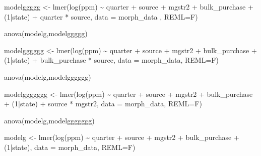 \documentclass[
  11pt,
]{article}
\newenvironment{Shaded}{\begin{snugshade}}{\end{snugshade}}
\newcommand{\AttributeTok}[1]{\textcolor[rgb]{0.77,0.63,0.00}{#1}}
\newcommand{\DecValTok}[1]{\textcolor[rgb]{0.00,0.00,0.81}{#1}}
\newcommand{\FunctionTok}[1]{\textcolor[rgb]{0.00,0.00,0.00}{#1}}
\newcommand{\NormalTok}[1]{#1}
\newcommand{\OtherTok}[1]{\textcolor[rgb]{0.56,0.35,0.01}{#1}}
\newcommand{\SpecialCharTok}[1]{\textcolor[rgb]{0.00,0.00,0.00}{#1}}
\begin{document}
\begin{Shaded}
\begin{Highlighting}[]
\NormalTok{modelggggg }\OtherTok{\textless{}{-}} \FunctionTok{lmer}\NormalTok{(}\FunctionTok{log}\NormalTok{(ppm) }\SpecialCharTok{\textasciitilde{}}\NormalTok{  quarter }\SpecialCharTok{+}\NormalTok{ source }\SpecialCharTok{+}\NormalTok{ mgstr2 }\SpecialCharTok{+}\NormalTok{ bulk\_purchase }\SpecialCharTok{+}\NormalTok{ (}\DecValTok{1}\SpecialCharTok{|}\NormalTok{state) }\SpecialCharTok{+}
\NormalTok{                 quarter }\SpecialCharTok{*}\NormalTok{ source, }\AttributeTok{data =}\NormalTok{ morph\_data , }\AttributeTok{REML=}\NormalTok{F)}

\FunctionTok{anova}\NormalTok{(modelg,modelggggg)}

\NormalTok{modelgggggg }\OtherTok{\textless{}{-}} \FunctionTok{lmer}\NormalTok{(}\FunctionTok{log}\NormalTok{(ppm) }\SpecialCharTok{\textasciitilde{}}\NormalTok{  quarter }\SpecialCharTok{+}\NormalTok{ source }\SpecialCharTok{+}\NormalTok{ mgstr2 }\SpecialCharTok{+}\NormalTok{ bulk\_purchase }\SpecialCharTok{+}\NormalTok{ (}\DecValTok{1}\SpecialCharTok{|}\NormalTok{state) }\SpecialCharTok{+}
\NormalTok{                 bulk\_purchase }\SpecialCharTok{*}\NormalTok{ source, }\AttributeTok{data =}\NormalTok{ morph\_data, }\AttributeTok{REML=}\NormalTok{F)}

\FunctionTok{anova}\NormalTok{(modelg,modelgggggg)}


\NormalTok{modelggggggg }\OtherTok{\textless{}{-}} \FunctionTok{lmer}\NormalTok{(}\FunctionTok{log}\NormalTok{(ppm) }\SpecialCharTok{\textasciitilde{}}\NormalTok{  quarter }\SpecialCharTok{+}\NormalTok{ source }\SpecialCharTok{+}\NormalTok{ mgstr2 }\SpecialCharTok{+}\NormalTok{ bulk\_purchase }\SpecialCharTok{+}\NormalTok{ (}\DecValTok{1}\SpecialCharTok{|}\NormalTok{state) }\SpecialCharTok{+}
\NormalTok{                 source }\SpecialCharTok{*}\NormalTok{ mgstr2, }\AttributeTok{data =}\NormalTok{ morph\_data, }\AttributeTok{REML=}\NormalTok{F)}

\FunctionTok{anova}\NormalTok{(modelg,modelggggggg)}
\end{Highlighting}
\end{Shaded}

\begin{Shaded}
\begin{Highlighting}[]
\NormalTok{modelg }\OtherTok{\textless{}{-}} \FunctionTok{lmer}\NormalTok{(}\FunctionTok{log}\NormalTok{(ppm) }\SpecialCharTok{\textasciitilde{}}\NormalTok{  quarter }\SpecialCharTok{+}\NormalTok{ source }\SpecialCharTok{+}\NormalTok{ mgstr2 }\SpecialCharTok{+}\NormalTok{ bulk\_purchase }\SpecialCharTok{+}\NormalTok{ (}\DecValTok{1}\SpecialCharTok{|}\NormalTok{state), }\AttributeTok{data =}\NormalTok{ morph\_data, }\AttributeTok{REML=}\NormalTok{F)}
\end{Highlighting}
\end{Shaded}
\end{document}
